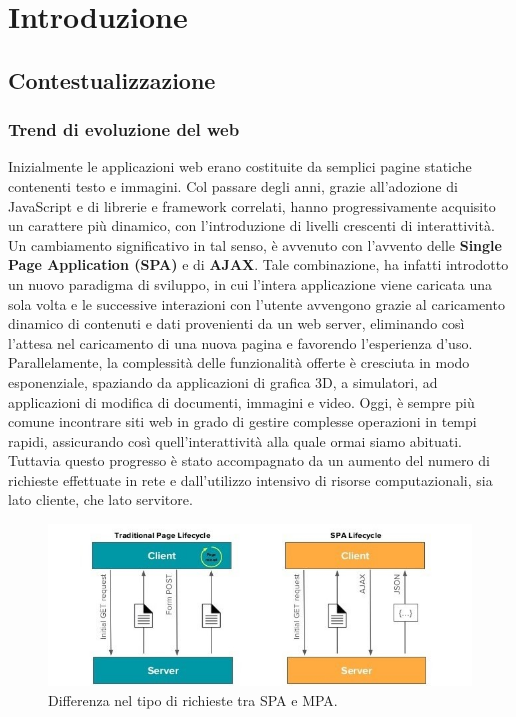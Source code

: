 \chapter{Introduzione}
\label{chap:1}

\section{Contestualizzazione}
\label{sec:Contestualizzazione}

\subsection{Trend di evoluzione del web}
Inizialmente le applicazioni web erano costituite da semplici pagine statiche contenenti testo e immagini.
Col passare degli anni, grazie all'adozione di JavaScript e di librerie e framework correlati, hanno progressivamente acquisito un carattere più dinamico, con l'introduzione di livelli crescenti di interattività. 
Un cambiamento significativo in tal senso, è avvenuto con l'avvento delle \textbf{Single Page Application (SPA)} e di \textbf{AJAX}.
Tale combinazione, ha infatti introdotto un nuovo paradigma di sviluppo, in cui l'intera applicazione viene caricata una sola volta e le successive interazioni con l'utente avvengono grazie al caricamento dinamico di contenuti e dati provenienti da un web server, eliminando così l'attesa nel caricamento di una nuova pagina e favorendo l'esperienza d'uso.
\\Parallelamente, la complessità delle funzionalità offerte è cresciuta in modo esponenziale, spaziando da applicazioni di grafica 3D, a simulatori, ad applicazioni di modifica di documenti, immagini e video.
Oggi, è sempre più comune incontrare siti web in grado di gestire complesse operazioni in tempi rapidi, assicurando così quell'interattività alla quale ormai siamo abituati. 
Tuttavia questo progresso è stato accompagnato da un aumento del numero di richieste effettuate in rete e dall'utilizzo intensivo di risorse computazionali, sia lato cliente, che lato servitore.
\begin{figure}
        \begin{center}
                \includegraphics[width=0.9\columnwidth]{images/spa.jpg}
        \end{center}
        \caption{Differenza nel tipo di richieste tra SPA e MPA.}
        \label{fig:spa}
\end{figure}
        
